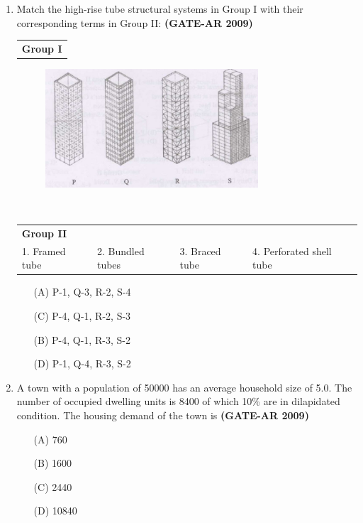 \documentclass[a4paper,10pt]{article}
\begin{document}
\begin{enumerate}[label=Q.\arabic]
\newpage

    \item Match the high-rise tube structural systems in Group I with their corresponding terms in Group II: \textbf{(GATE-AR 2009)} \\
    \begin{tabular}{ l }
	\textbf{Group I} \\
	\end{tabular}
	\begin{figure}[h!]
        \centering
        \includegraphics[width=0.75\textwidth]{Pic02.jpg}
	\end{figure} \\
	\begin{tabular}{ l l l l }
	\textbf{Group II} & & & \\
	1. Framed tube & 2. Bundled tubes & 3. Braced tube & 4. Perforated shell tube \\
	\end{tabular}
	\begin{multicols}{2}
	\begin{itemize}
        \item[(A)] P-1, Q-3, R-2, S-4
        \item[(C)] P-4, Q-1, R-2, S-3
        \item[(B)] P-4, Q-1, R-3, S-2
        \item[(D)] P-1, Q-4, R-3, S-2
    \end{itemize}
	\end{multicols}

    \item A town with a population of 50000 has an average household size of 5.0. The number of occupied dwelling units is 8400 of which 10\% are in dilapidated condition. The housing demand of the town is \textbf{(GATE-AR 2009)}
    \begin{multicols}{4}
	\begin{itemize}
        \item[(A)] 760
        \item[(B)] 1600
        \item[(C)] 2440
        \item[(D)] 10840
    \end{itemize}
	\end{multicols}


\end{enumerate}
\end{document}
